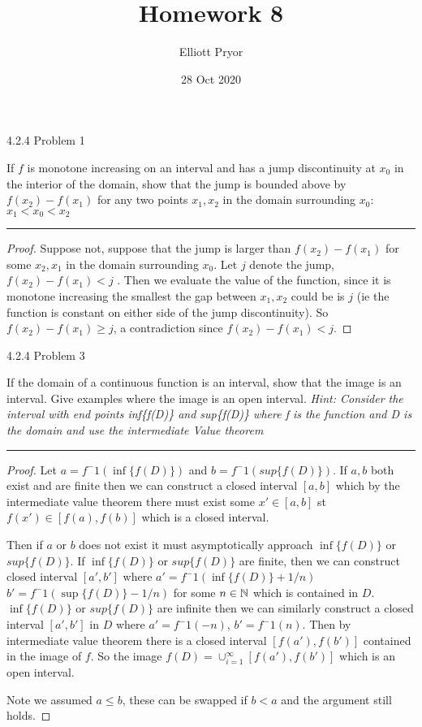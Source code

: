 \documentclass[11pt]{article}
\title{Homework 8}
\author{Elliott Pryor}
\date{28 Oct 2020}
\begin{document}
\maketitle

 4.2.4 Problem 1

If $f$ is monotone increasing on an interval and has a jump discontinuity at $x_0$ in the interior of the domain, show that the jump is bounded above by $f(x_2) - f(x_1)$ for any two points $x_1, x_2$ in the domain surrounding $x_0$: $x_1 < x_0 < x_2$

\hrule

\begin{proof}

Suppose not, suppose that the jump is larger than $f(x_2) - f(x_1)$ for some $x_2, x_1$ in the domain surrounding $x_0$. Let $j$ denote the jump, $f(x_2) - f(x_1) < j$ . Then we evaluate the value of the function, since it is monotone increasing the smallest the gap between $x_1, x_2$ could be is $j$ (ie the function is constant on either side of the jump discontinuity). So $f(x_2) - f(x_1) \geq j$, a contradiction since $f(x_2) - f(x_1) < j$.

\end{proof}




 4.2.4 Problem 3

If the domain of a continuous function is an interval, show that the image is an interval. Give examples where the image is an open interval.
\textit{Hint: Consider the interval with end points inf\{f(D)\} and sup\{f(D)\} where f is the function and D is the domain and use the intermediate Value theorem}

\hrule


\begin{proof}

Let $a = f^-1(\inf\{f(D)\})$ and $b = f^-1(sup\{f(D)\})$. If $a, b$ both exist and are finite then we can construct a closed interval $[a, b]$ which by the intermediate value theorem there must exist some $x' \in [a,b]$ st $f(x') \in [f(a), f(b)]$ which is a closed interval.

Then if $a$ or $b$ does not exist it must asymptotically approach $\inf\{f(D)\}$ or $sup\{f(D)\}$. 
If $\inf\{f(D)\}$ or $sup\{f(D)\}$ are finite, then we can construct closed interval $[a', b']$ where $a' = f^-1(\inf\{f(D)\} + 1/n)$ $b' = f^-1(\sup\{f(D)\} - 1/n)$ for some $n \in \mathbb{N}$ which is contained in $D$. 
$\inf\{f(D)\}$ or $sup\{f(D)\}$ are infinite then we can similarly construct a closed interval $[a', b']$ in $D$ where $a' = f^-1(-n)$, $b' = f^-1(n)$. 
Then by intermediate value theorem there is a closed interval $[f(a'), f(b')]$ contained in the image of $f$. 
So the image $f(D) = \cup_{i = 1}^{\infty} [f(a'), f(b')]$ which is an open interval.

Note we assumed $a \leq b$, these can be swapped if $b < a$ and the argument still holds.  


\end{proof}
\end{document}
